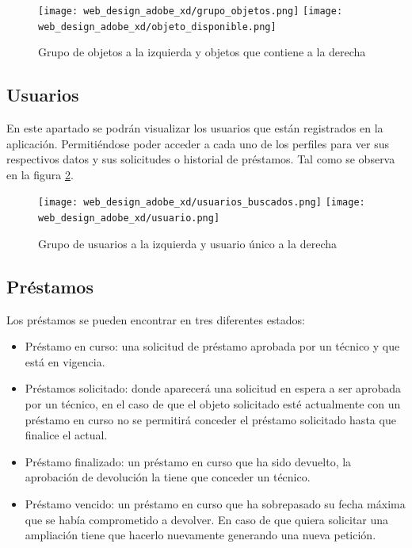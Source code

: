 \begin{figure}[ht]
    \centering
    \texttt{[image: web\_design\_adobe\_xd/grupo\_objetos.png]}
    \texttt{[image: web\_design\_adobe\_xd/objeto\_disponible.png]}
    \caption{Grupo de objetos a la izquierda y objetos que contiene a la derecha}\label{grupo_objetos_y_objetos_design}
\end{figure}

\subsection{Usuarios}

En este apartado se podrán visualizar los usuarios que están registrados en la aplicación. Permitiéndose poder acceder a cada uno de los perfiles para ver sus respectivos datos y sus solicitudes o historial de préstamos. Tal como se observa en la figura \ref{grupo_usuarios_design}.

\begin{figure}[ht]
    \begin{center}
        \texttt{[image: web\_design\_adobe\_xd/usuarios\_buscados.png]}
        \texttt{[image: web\_design\_adobe\_xd/usuario.png]}
        \caption{Grupo de usuarios a la izquierda y usuario único a la derecha}\label{grupo_usuarios_design}
    \end{center}
\end{figure}

\subsection{Préstamos}

Los préstamos se pueden encontrar en tres diferentes estados:

\begin{itemize}
    \item Préstamo en curso: una solicitud de préstamo aprobada por un técnico y que está en vigencia.
    \item Préstamos solicitado: donde aparecerá una solicitud en espera a ser aprobada por un técnico, en el caso de que el objeto solicitado esté actualmente con un préstamo en curso no se permitirá conceder el préstamo solicitado hasta que finalice el actual.
    \item Préstamo finalizado: un préstamo en curso que ha sido devuelto, la aprobación de devolución la tiene que conceder un técnico.
    \item Préstamo vencido: un préstamo en curso que ha sobrepasado su fecha máxima que se había comprometido a devolver. En caso de que quiera solicitar una ampliación tiene que hacerlo nuevamente generando una nueva petición.
\end{itemize}

